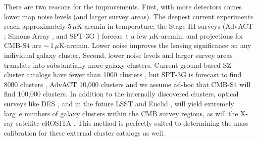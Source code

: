 There are two reasons for the improvements.
First, with more detectors comes lower map noise levels (and larger survey areas).
The deepest current experiments reach approximately $5\,\mu$K-arcmin in temperature; the Stage III surveys  (AdvACT \citep{advact_2016};  Simons Array \citep{PB2_2016}, and SPT-3G \citep{benson2015_3g}) forecas\
t a few $\mu$K-arcmin; and projections for CMB-S4 are $\sim$\,1\,$\mu$K-arcmin.
Lower noise improves the lensing significance on any individual galaxy cluster.
Second, lower noise levels and larger survey areas translate into substantially more galaxy clusters.
Current ground-based SZ cluster catalogs have fewer than 1000 clusters \citep{ACTSZ2013, bleem2015}, but SPT-3G is forecast to find 8000 clusters \citep{benson2015_3g}, AdvACT 10,000 clusters \citep{advact_2016} and we assume ad-hoc that CMB-S4 will find 100,000 clusters.
In addition to the internally discovered clusters, optical surveys like DES \citep{rykoff2016}, and in the future LSST \citep{lsst_science_book} and Euclid \citep{euclid_science_book}, will yield extremely larg\
e numbers of galaxy clusters within the CMB survey regions, as will the X-ray satellite eROSITA \citep{erosita_science_book}.
This method is perfectly suited to determining the mass calibration for these external cluster catalogs as well.

